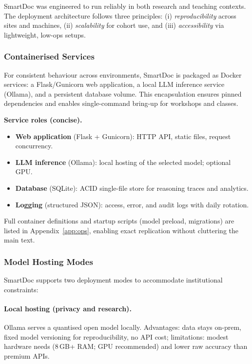 SmartDoc was engineered to run reliably in both research and teaching contexts. The deployment architecture follows three principles: (i) \emph{reproducibility} across sites and machines, (ii) \emph{scalability} for cohort use, and (iii) \emph{accessibility} via lightweight, low-ops setups.

\subsubsection{Containerised Services}
For consistent behaviour across environments, SmartDoc is packaged as Docker services: a Flask/Gunicorn web application, a local LLM inference service (Ollama), and a persistent database volume. This encapsulation ensures pinned dependencies and enables single-command bring-up for workshops and classes.

\noindent\textbf{Service roles (concise).}
\begin{itemize}
  \item \textbf{Web application} (Flask + Gunicorn): HTTP API, static files, request concurrency.
  \item \textbf{LLM inference} (Ollama): local hosting of the selected model; optional GPU.
  \item \textbf{Database} (SQLite): ACID single-file store for reasoning traces and analytics.
  \item \textbf{Logging} (structured JSON): access, error, and audit logs with daily rotation.
\end{itemize}

Full container definitions and startup scripts (model preload, migrations) are listed in Appendix~\ref{app:ops}, enabling exact replication without cluttering the main text.

\subsubsection{Model Hosting Modes}
SmartDoc supports two deployment modes to accommodate institutional constraints:

\paragraph{Local hosting (privacy and research).}
Ollama serves a quantised open model locally. Advantages: data stays on-prem, fixed model versioning for reproducibility, no API cost; limitations: modest hardware needs (8\,GB+ RAM; GPU recommended) and lower raw accuracy than premium APIs.

